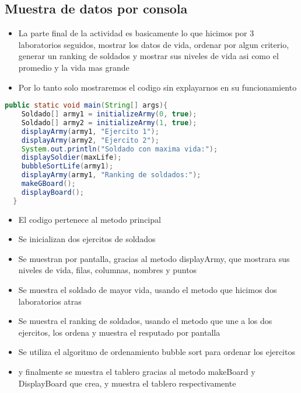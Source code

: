 \subsection{Muestra de datos por consola}
\begin{itemize}
  \item La parte final de la actividad es basicamente lo que hicimos por 3 laboratorios seguidos, mostrar los datos de vida, ordenar por algun criterio, generar un ranking de soldados y mostrar sus niveles de vida asi como el promedio y la vida mas grande
  \item Por lo tanto solo mostraremos el codigo sin explayarnos en su funcionamiento
\end{itemize}
\begin{lstlisting}[language=java, caption={Codigo fuente, Videojuego.java}]
  public static void main(String[] args){
    Soldado[] army1 = initializeArmy(0, true); 
    Soldado[] army2 = initializeArmy(1, true); 
    displayArmy(army1, "Ejercito 1");
    displayArmy(army2, "Ejercito 2");
    System.out.println("Soldado con maxima vida:");
    displaySoldier(maxLife);
    bubbleSortLife(army1);
    displayArmy(army1, "Ranking de soldados:");
    makeGBoard();
    displayBoard();
  }
\end{lstlisting}
\begin{itemize}
  \item El codigo pertenece al metodo principal
  \item Se inicializan dos ejercitos de soldados
  \item Se muestran por pantalla, gracias al metodo displayArmy, que mostrara sus niveles de vida, filas, columnas, nombres y puntos
  \item Se muestra el soldado de mayor vida, usando el metodo que hicimos dos laboratorios atras
  \item Se muestra el ranking de soldados, usando el metodo que une a los dos ejercitos, los ordena y muestra el resputado por pantalla
  \item Se utiliza el algoritmo de ordenamiento bubble sort para ordenar los ejercitos
  \item y finalmente se muestra el tablero gracias al metodo makeBoard y DisplayBoard que crea, y muestra el tablero respectivamente
\end{itemize}

